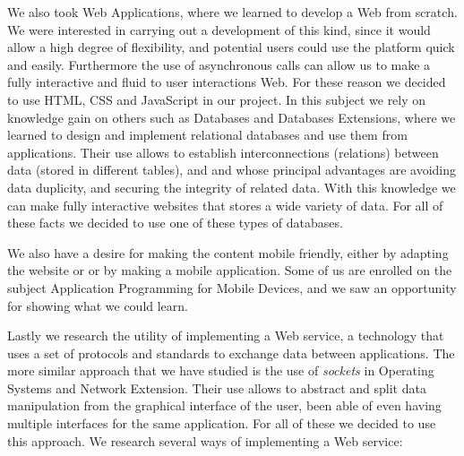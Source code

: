 We also took Web Applications, where we learned to develop a Web from scratch. We were interested in carrying out a development of this kind, since it would allow a high degree of flexibility, and potential users could use the platform quick and easily. Furthermore the use of asynchronous calls can allow us to make a fully interactive and fluid to user interactions Web. For these reason we decided to use HTML, CSS and JavaScript in our project. In this subject we rely on knowledge gain on others such as Databases and Databases Extensions, where we learned to design and implement relational databases and use them from applications. Their use allows to establish interconnections (relations) between data (stored in different tables), and and whose principal advantages are avoiding data duplicity, and securing the integrity of related data. With this knowledge we can make fully interactive websites that stores a wide variety of data. For all of these facts we decided to use one of these types of databases.  

We also have a desire for making the content mobile friendly, either by adapting the website or or by making a mobile application. Some of us are enrolled on the subject Application Programming for Mobile Devices, and we saw an opportunity for showing what we could learn.  

Lastly we research the utility of implementing a Web service, a technology that uses a set of protocols and standards to exchange data between applications. The more similar approach that we have studied is the use of \emph{sockets} in Operating Systems and Network Extension. Their use allows to abstract and split data manipulation from the graphical interface of the user, been able of even having multiple interfaces for the same application. For all of these we decided to use this approach. We research several ways of implementing a Web service:

